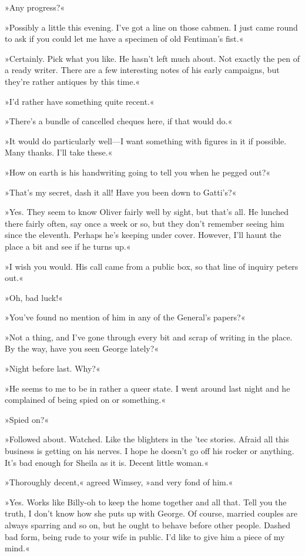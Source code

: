 »Any progress?«

»Possibly a little this evening. I've got a line on those cabmen. I just came round to ask if you could let me have a specimen of old Fentiman's fist.«

»Certainly. Pick what you like. He hasn't left much about. Not exactly the pen of a ready writer. There are a few interesting notes of his early campaigns, but they're rather antiques by this time.«

»I'd rather have something quite recent.«

»There's a bundle of cancelled cheques here, if that would do.«

»It would do particularly well\allowbreak---\allowbreak I want something with figures in it if possible. Many thanks. I'll take these.«

»How on earth is his handwriting going to tell you when he pegged out?«

»That's my secret, dash it all! Have you been down to Gatti's?«

»Yes. They seem to know Oliver fairly well by sight, but that's all. He lunched there fairly often, say once a week or so, but they don't remember seeing him since the eleventh. Perhaps he's keeping under cover. However, I'll haunt the place a bit and see if he turns up.«

»I wish you would. His call came from a public box, so that line of inquiry peters out.«

»Oh, bad luck!«

»You've found no mention of him in any of the General's papers?«

»Not a thing, and I've gone through every bit and scrap of writing in the place. By the way, have you seen George lately?«

»Night before last. Why?«

»He seems to me to be in rather a queer state. I went around last night and he complained of being spied on or something.«

»Spied on?«

»Followed about. Watched. Like the blighters in the 'tec stories. Afraid all this business is getting on his nerves. I hope he doesn't go off his rocker or anything. It's bad enough for Sheila as it is. Decent little woman.«

»Thoroughly decent,« agreed Wimsey, »and very fond of him.«

»Yes. Works like Billy-oh to keep the home together and all that. Tell you the truth, I don't know how she puts up with George. Of course, married couples are always sparring and so on, but he ought to behave before other people. Dashed bad form, being rude to your wife in public. I'd like to give him a piece of my mind.«

